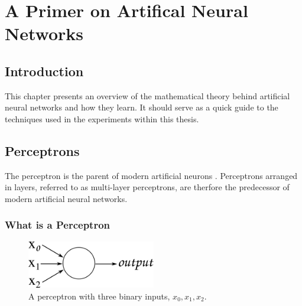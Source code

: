 \chapter{A Primer on Artifical Neural Networks} %

\label{Chapter3} %


\section{Introduction}
This chapter presents an overview of the mathematical theory behind artificial neural networks and how they learn. It should serve as a quick guide to the techniques used in the experiments within this thesis.

\section{Perceptrons}
\label{sec:percep}
The perceptron is the parent of modern artificial neurons \cite{rosenblatt1958perceptron}.
Perceptrons arranged in layers, referred to as multi-layer perceptrons, are therfore the predecessor of modern artificial neural networks.

\subsection{What is a Perceptron}



\begin{figure}
	\centering
	\includegraphics[width=0.5\textwidth]{Figs/intro2dl/perceptron.png}
	
	\caption{A perceptron with three binary inputs, $x_0, x_1, x_2$.}
	\label{fig:perceptron}
\end{figure}

